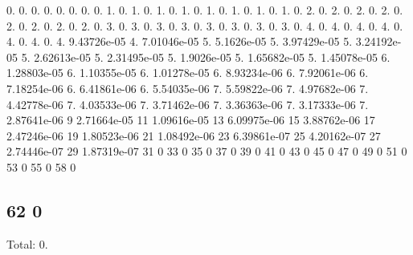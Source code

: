 0. 0. 0. 0. 0. 0. 0. 0. 1. 0. 1. 0. 1. 0. 1. 0. 1. 0. 1. 0. 1. 0. 1. 0. 2. 0. 2. 0. 2. 0. 2. 0. 2. 0. 2. 0. 2. 0. 2. 0. 3. 0. 3. 0. 3. 0. 3. 0. 3. 0. 3. 0. 3. 0. 3. 0. 4. 0. 4. 0. 4. 0. 4. 0. 4. 0. 4. 0. 4. 9.\+43726e-\/05 4. 7.\+01046e-\/05 5. 5.\+1626e-\/05 5. 3.\+97429e-\/05 5. 3.\+24192e-\/05 5. 2.\+62613e-\/05 5. 2.\+31495e-\/05 5. 1.\+9026e-\/05 5. 1.\+65682e-\/05 5. 1.\+45078e-\/05 6. 1.\+28803e-\/05 6. 1.\+10355e-\/05 6. 1.\+01278e-\/05 6. 8.\+93234e-\/06 6. 7.\+92061e-\/06 6. 7.\+18254e-\/06 6. 6.\+41861e-\/06 6. 5.\+54035e-\/06 7. 5.\+59822e-\/06 7. 4.\+97682e-\/06 7. 4.\+42778e-\/06 7. 4.\+03533e-\/06 7. 3.\+71462e-\/06 7. 3.\+36363e-\/06 7. 3.\+17333e-\/06 7. 2.\+87641e-\/06 9 2.\+71664e-\/05 11 1.\+09616e-\/05 13 6.\+09975e-\/06 15 3.\+88762e-\/06 17 2.\+47246e-\/06 19 1.\+80523e-\/06 21 1.\+08492e-\/06 23 6.\+39861e-\/07 25 4.\+20162e-\/07 27 2.\+74446e-\/07 29 1.\+87319e-\/07 31 0 33 0 35 0 37 0 39 0 41 0 43 0 45 0 47 0 49 0 51 0 53 0 55 0 58 0 \subsection*{62 0 }

Total\+: 0. 